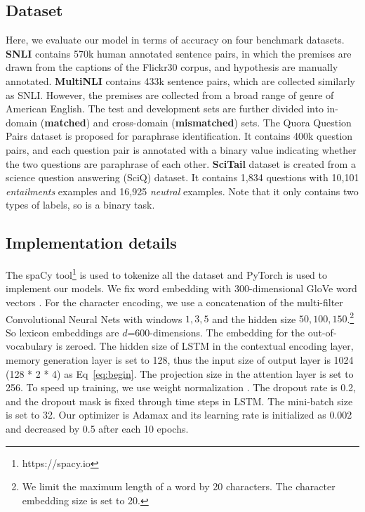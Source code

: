 \documentclass[11pt,a4paper]{article}
\begin{document}
\subsection{Dataset}
\label{sec:data}
Here, we evaluate our model in terms of accuracy on four benchmark datasets. \textbf{SNLI} \cite{bowman2015large} contains 570k human annotated sentence pairs, in which the premises are drawn from the captions of the Flickr30 corpus, and hypothesis are manually annotated. \textbf{MultiNLI} \cite{2017arXiv170405426W} contains 433k sentence pairs, which are collected similarly as SNLI. However, the premises are collected from a broad range of genre of American English. The test and development sets are further divided into in-domain (\textbf{matched}) and cross-domain (\textbf{mismatched}) sets.  The Quora Question Pairs dataset \cite{wang2017bilateral} is proposed for paraphrase identification. It contains 400k question pairs, and each question pair is annotated with a binary value indicating whether the two questions are paraphrase of each other. \textbf{SciTail} dataset is created from a science question answering (SciQ) dataset. It contains 1,834 questions with 10,101 \textit{entailments} examples and 16,925 \textit{neutral} examples. Note that it only contains two types of labels, so is a binary task. 
\subsection{Implementation details}
\label{sec:imp}
The spaCy tool\footnote{https://spacy.io} is used to tokenize all the dataset and PyTorch is used to implement our models. We fix word embedding with 300-dimensional GloVe word vectors \cite{pennington2014glove}. For the character encoding, we use a concatenation of the multi-filter Convolutional Neural Nets with windows $1, 3, 5$ and the hidden size $50, 100, 150$.\footnote{We limit the maximum length of a word by 20 characters. The character embedding size is set to 20.} So lexicon embeddings are $d$=600-dimensions. The embedding for the out-of-vocabulary is zeroed. The hidden size of LSTM in the contextual encoding layer, memory generation layer is set to 128, thus the input size of output layer is 1024 (128 * 2 * 4) as Eq~\ref{eq:begin}. The projection size in the attention layer is set to 256. To speed up training, we use weight normalization \cite{salimans2016weight}. The dropout rate is 0.2, and the dropout mask is fixed through time steps \cite{gal2016theoretically} in LSTM. The mini-batch size is set to 32. Our optimizer is Adamax \cite{kingma2014adam} and its learning rate is initialized as 0.002 and decreased by 0.5 after each 10 epochs.
\end{document}
